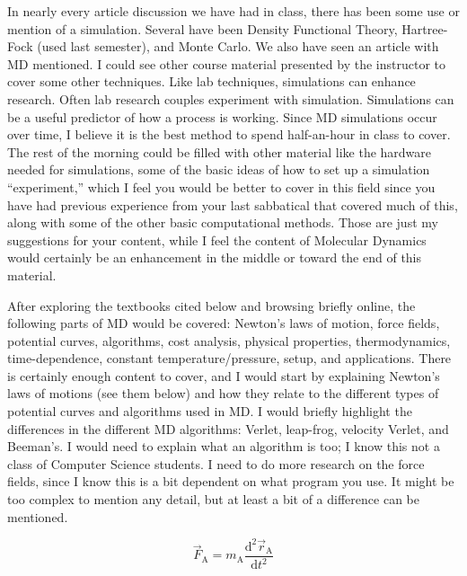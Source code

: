 \documentclass[11pt]{article}
\begin{document}
In nearly every article discussion we have had in class, there has been some use or mention of a simulation. Several have been Density Functional Theory, Hartree-Fock (used last semester), and Monte Carlo. We also have seen an article with MD mentioned. I could see other course material presented by the instructor to cover some other techniques. Like lab techniques, simulations can enhance research. Often lab research couples experiment with simulation. Simulations can be a useful predictor of how a process is working. Since MD simulations occur over time, I believe it is the best method to spend half-an-hour in class to cover. The rest of the morning could be filled with other material like the hardware needed for simulations, some of the basic ideas of how to set up a simulation ``experiment,'' which I feel you would be better to cover in this field since you have had previous experience from your last sabbatical that covered much of this, along with some of the other basic computational methods. Those are just my suggestions for your content, while I feel the content of Molecular Dynamics would certainly be an enhancement in the middle or toward the end of this material.

After exploring the textbooks cited below and browsing briefly online, the following parts of MD would be covered: Newton's laws of motion, force fields, potential curves, algorithms, cost analysis, physical properties, thermodynamics, time-dependence, constant temperature/pressure, setup, and applications. There is certainly enough content to cover, and I would start by explaining Newton's laws of motions (see them below) and how they relate to the different types of potential curves and algorithms used in MD. I would briefly highlight the differences in the different MD algorithms: Verlet, leap-frog, velocity Verlet, and Beeman's. I would need to explain what an algorithm is too; I know this not a class of Computer Science students. I need to do more research on the force fields, since I know this is a bit dependent on what program you use. It might be too complex to mention any detail, but at least a bit of a difference can be mentioned.

\begin{center}
\begin{equation}
  \vec{F}_{\textrm{A}} = m_{\textrm{A}} \frac{\textrm{d}^2\vec{r}_{\textrm{A}}}{\textrm{d}t^2}
\end{equation}
\end{center}
\end{document}
